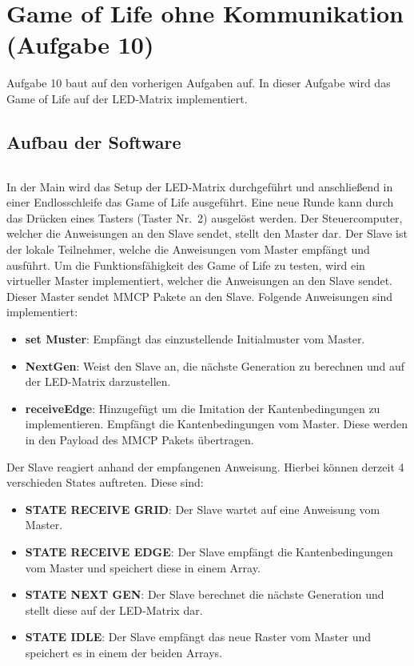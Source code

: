 \newpage
\section{Game of Life ohne Kommunikation (Aufgabe 10)}

Aufgabe 10 baut auf den vorherigen Aufgaben auf. In dieser Aufgabe wird das
Game of Life auf der LED-Matrix implementiert.

\subsection{Aufbau der Software}

\inputminted[linenos,fontsize=\footnotesize]{c}{A10_Abgabe/iceduino_setup_gol/sw/programs/iceduino_game_of_life/main.c}

In der Main wird das Setup der LED-Matrix durchgeführt und anschließend in
einer Endlosschleife das Game of Life ausgeführt. Eine neue Runde kann durch
das Drücken eines Tasters (Taster Nr.~2) ausgelöst werden. 
Der Steuercomputer, welcher die Anweisungen an den Slave sendet, stellt den
Master dar. Der Slave ist der lokale Teilnehmer, welche die Anweisungen vom Master
empfängt und ausführt. 
Um die Funktionsfähigkeit des Game of Life zu testen, wird ein virtueller
Master implementiert, welcher die Anweisungen an den Slave sendet.
Dieser
Master sendet MMCP Pakete an den Slave. Folgende Anweisungen sind
implementiert:
\begin{itemize}

  \item \textbf{set Muster}: Empfängt das einzustellende Initialmuster vom Master.
  \item \textbf{NextGen}: Weist den Slave an, die nächste Generation zu berechnen und auf der LED-Matrix darzustellen.
  \item \textbf{receiveEdge}: Hinzugefügt um die Imitation der Kantenbedingungen zu implementieren. Empfängt die Kantenbedingungen vom Master. Diese werden in den Payload des MMCP Pakets übertragen.

\end{itemize}

Der Slave reagiert anhand der empfangenen Anweisung. Hierbei können derzeit 4
verschieden States auftreten. Diese sind:
\begin{itemize}
  \item \textbf{STATE RECEIVE GRID}: Der Slave wartet auf eine Anweisung vom Master.
  \item \textbf{STATE RECEIVE EDGE}: Der Slave empfängt die Kantenbedingungen vom Master und speichert diese in einem Array.
  \item \textbf{STATE NEXT GEN}: Der Slave berechnet die nächste Generation und stellt diese auf der LED-Matrix dar.
  \item \textbf{STATE IDLE}: Der Slave empfängt das neue Raster vom Master und speichert es in einem der beiden Arrays.
\end{itemize}


